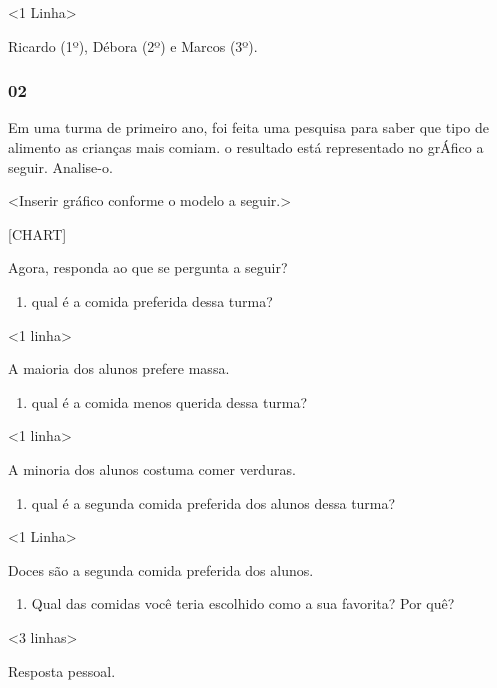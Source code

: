 \textless{}1 Linha\textgreater{}

Ricardo (1º), Débora (2º) e Marcos (3º).

\subsubsection{02}\label{section-77}

Em uma turma de primeiro ano, foi feita uma pesquisa para saber que tipo de alimento as
crianças mais comiam. o resultado está representado no grÁfico a seguir. Analise-o.

\textless{}Inserir gráfico conforme o modelo a seguir.\textgreater{}

{{[}CHART{]}}

Agora, responda ao que se pergunta a seguir?

\begin{enumerate}
\def\labelenumi{\Alph{enumi})}
\item
  qual é a comida preferida dessa turma?
\end{enumerate}

\textless{}1 linha\textgreater{}

A maioria dos alunos prefere massa.

\begin{enumerate}
\def\labelenumi{\Alph{enumi})}
\item
  qual é a comida menos querida dessa turma?
\end{enumerate}

\textless{}1 linha\textgreater{}

A minoria dos alunos costuma comer verduras.

\begin{enumerate}
\def\labelenumi{\Alph{enumi})}
\item
  qual é a segunda comida preferida dos alunos dessa turma?
\end{enumerate}

\textless{}1 Linha\textgreater{}

Doces são a segunda comida preferida dos alunos.

\begin{enumerate}
\def\labelenumi{\Alph{enumi})}
\item
  Qual das comidas você teria escolhido como a sua favorita? Por quê?
\end{enumerate}

\textless{}3 linhas\textgreater{}

Resposta pessoal.

